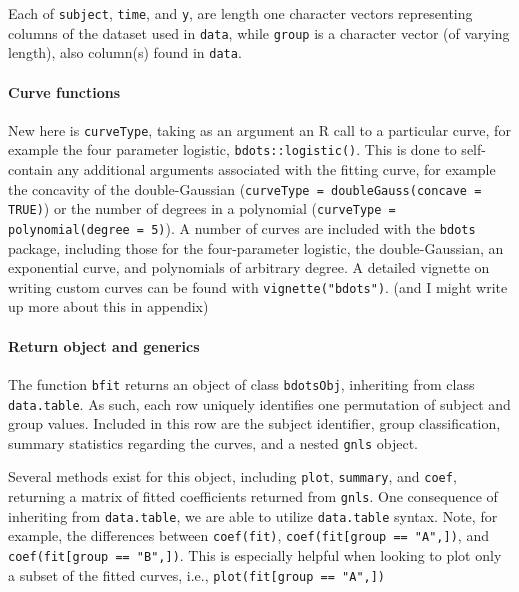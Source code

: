 \documentclass{article}
\newcommand{\xt}{\texttt}%
\begin{document}
Each of \texttt{subject}, \texttt{time}, and \texttt{y}, are length one character vectors representing columns of the dataset used in \texttt{data}, while \xt{group} is a character vector (of varying length), also column(s) found in \xt{data}.

\paragraph{Curve functions}  New here is \texttt{curveType}, taking as an argument an R call to a particular curve, for example the four parameter logistic, \texttt{bdots::logistic()}. This is done to self-contain any additional arguments associated with the fitting curve, for example the concavity of the double-Gaussian (\texttt{curveType = doubleGauss(concave = TRUE)}) or the number of degrees in a polynomial (\texttt{curveType = polynomial(degree = 5)}). A number of curves are included with the \texttt{bdots} package, including those for the four-parameter logistic, the double-Gaussian, an exponential curve, and polynomials of arbitrary degree. A detailed vignette on writing custom curves can be found with \texttt{vignette("bdots")}. (and I might write up more about this in appendix)

\paragraph{Return object and generics}


The function \texttt{bfit} returns an object of class \texttt{bdotsObj}, inheriting from class \texttt{data.table}. As such, each row uniquely identifies one permutation of subject and group values. Included in this row are the subject identifier, group classification, summary statistics regarding the curves, and a nested \xt{gnls} object.


Several methods exist for this object, including \texttt{plot}, \texttt{summary}, and \texttt{coef}, returning a matrix of fitted coefficients returned from \texttt{gnls}. One consequence of inheriting from \texttt{data.table}, we are able to utilize \xt{data.table} syntax. Note, for example, the differences between \texttt{coef(fit)}, \texttt{coef(fit[group == "A",])}, and \texttt{coef(fit[group == "B",])}. This is especially helpful when looking to plot only a subset of the fitted curves, i.e., \xt{plot(fit[group == "A",])}

\end{document}
